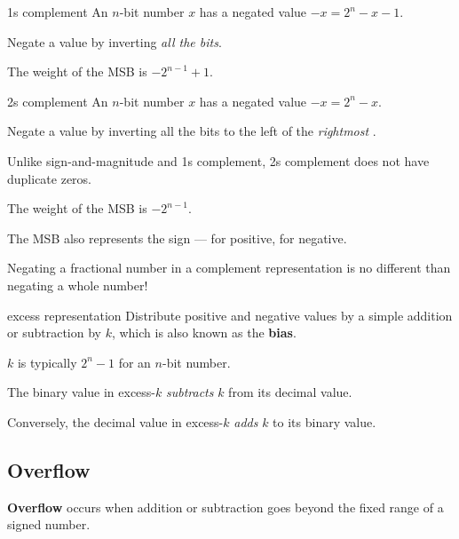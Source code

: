 \begin{defn}{1s complement}
    An $n$-bit number $x$ has a negated value $-x = 2^n - x - 1$.

    Negate a value by inverting \textit{all the bits}.

    \begin{itemize}
    \end{itemize}

    The weight of the MSB is $-2^{n-1} + 1$.
\end{defn}

\begin{defn}{2s complement}
    An $n$-bit number $x$ has a negated value $-x = 2^n - x$.

    Negate a value by inverting all the bits to the left of the \textit{rightmost} .

    \begin{itemize}
    \end{itemize}

    Unlike sign-and-magnitude and 1s complement, 2s complement does not have duplicate zeros.

    The weight of the MSB is $-2^{n-1}$.

    The MSB also represents the sign  ---  for positive,  for negative.
\end{defn}

Negating a fractional number in a complement representation is no different
than negating a whole number!

\begin{defn}{excess representation}
    Distribute positive and negative values by a simple addition or subtraction by $k$,
    which is also known as the \textbf{bias}.
    
    $k$ is typically $2^n - 1$ for an $n$-bit number.

    The binary value in excess-$k$ \textit{subtracts} $k$ from its decimal value.

    Conversely, the decimal value in excess-$k$ \textit{adds} $k$ to its binary value.
\end{defn}

\subsection{Overflow}
\textbf{Overflow} occurs when addition or subtraction goes beyond the fixed range of a signed number.

